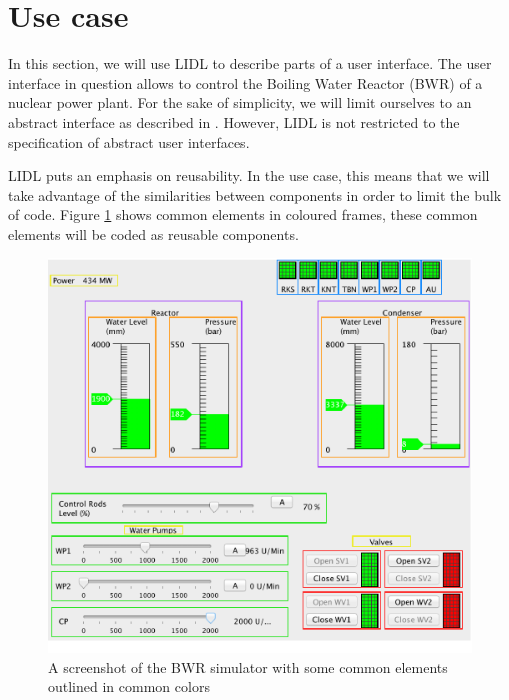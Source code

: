 \documentclass[10pt]{sigplanconf}
\begin{document}
\section{Use case}

In this section, we will use LIDL to describe parts of a user interface. The user interface in question allows to control the Boiling Water Reactor (BWR) of a nuclear power plant. For the sake of simplicity, we will limit ourselves to an abstract interface as described in \cite{Paterno:2009:MUD:1614390.1614394}. However, LIDL is not restricted to the specification of abstract user interfaces.

LIDL puts an emphasis on reusability. In the use case, this means that we will take advantage of the similarities between components in order to limit the bulk of code. Figure \ref{fig:screenshot} shows common elements in coloured frames, these common elements will be coded as reusable components.

\begin{figure}[h]
\centering
\includegraphics[width=\linewidth,height=\linewidth,keepaspectratio]{figures/screenshot.pdf}
\caption{A screenshot of the BWR simulator with some common elements outlined in common colors} 
\label{fig:screenshot}
\end{figure}
\end{document}
